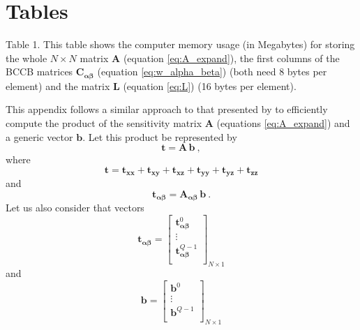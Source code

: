\documentclass[manuscript,noblind]{geophysics}
\begin{document}
\section{Tables}

{Table 1. This table shows the computer memory usage (in Megabytes) for storing the whole $N \times N$ matrix $\mathbf{A}$ (equation \ref{eq:A_expand}), the first columns of the BCCB matrices $\mathbf{C}_{\boldsymbol{\alpha\beta}}$ (equation \ref{eq:w_alpha_beta}) (both need 8 bytes per element) and the matrix $\mathbf{L}$ (equation \ref{eq:L}) (16 bytes per element).
\label{tab:RAM-usage}}


This appendix follows a similar approach to that presented by \citet{takahashi2020convolutional}
to efficiently compute the product of the sensitivity matrix
$\mathbf{A}$ (equations \ref{eq:A_expand}) and a generic vector $\mathbf{b}$. 
Let this product be represented by
\begin{equation}
	\mathbf{t} = 
	\mathbf{A} \, \mathbf{b} \: ,
	\label{eq:t}
\end{equation}
where 
\begin{equation}
	\mathbf{t} = \mathbf{t}_{\boldsymbol{xx}} + \mathbf{t}_{\boldsymbol{xy}} + \mathbf{t}_{\boldsymbol{xz}} +
	\mathbf{t}_{\boldsymbol{yy}} + \mathbf{t}_{\boldsymbol{yz}} + \mathbf{t}_{\boldsymbol{zz}}
	\label{eq:t-components}
\end{equation}
and
\begin{equation}
	\mathbf{t}_{\boldsymbol{\alpha\beta}} = 
	\mathbf{A_{\boldsymbol{\alpha\beta}}} \, \mathbf{b} \: .
	\label{eq:t-alpha-beta}
\end{equation}
Let us also consider that vectors
\begin{equation}
	\mathbf{t}_{\boldsymbol{\alpha\beta}} = \begin{bmatrix}
		\mathbf{t}^{0}_{\boldsymbol{\alpha\beta}} \\
		\vdots \\
		\mathbf{t}^{Q-1}_{\boldsymbol{\alpha\beta}} \\
	\end{bmatrix}_{N \times 1}
	\label{eq:t-alpha-beta-partitioned}
\end{equation} 
and
\begin{equation}
	\mathbf{b} = \begin{bmatrix}
		\mathbf{b}^{0} \\
		\vdots \\
		\mathbf{b}^{Q-1} \\
	\end{bmatrix}_{N \times 1}
	\label{eq:b-partitioned}
\end{equation}
\end{document}
